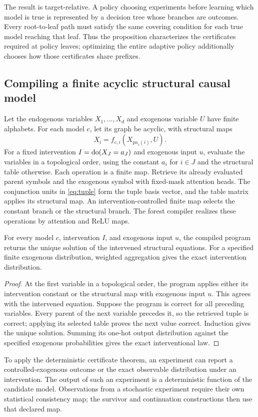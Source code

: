 The result is target-relative. A policy choosing experiments before learning which model is true is represented by a decision tree whose branches are outcomes. Every root-to-leaf path must satisfy the same covering condition for each true model reaching that leaf. Thus the proposition characterizes the certificates required at policy leaves; optimizing the entire adaptive policy additionally chooses how those certificates share prefixes.

\subsection{Compiling a finite acyclic structural causal model}
Let the endogenous variables $X_1,\ldots,X_d$ and exogenous variable $U$ have finite alphabets. For each model $c$, let its graph be acyclic, with structural maps
\[
 X_i=f_{c,i}(X_{\mathrm{pa}_c(i)},U).
\]
For a fixed intervention $I=\operatorname{do}(X_J=a_J)$ and exogenous input $u$, evaluate the variables in a topological order, using the constant $a_i$ for $i\in J$ and the structural table otherwise. Each operation is a finite map. Retrieve its already evaluated parent symbols and the exogenous symbol with fixed-mask attention heads. The conjunction units in \eqref{eq:tuple} form the tuple basis vector, and the table matrix applies its structural map. An intervention-controlled finite map selects the constant branch or the structural branch. The forest compiler realizes these operations by attention and ReLU maps.

\begin{proposition}\label{prop:scm}
For every model $c$, intervention $I$, and exogenous input $u$, the compiled program returns the unique solution of the intervened structural equations. For a specified finite exogenous distribution, weighted aggregation gives the exact intervention distribution.
\end{proposition}
\begin{proof}
At the first variable in a topological order, the program applies either its intervention constant or the structural map with exogenous input $u$. This agrees with the intervened equation. Suppose the program is correct for all preceding variables. Every parent of the next variable precedes it, so the retrieved tuple is correct; applying its selected table proves the next value correct. Induction gives the unique solution. Summing its one-hot output distribution against the specified exogenous probabilities gives the exact interventional law.
\end{proof}
To apply the deterministic certificate theorem, an experiment can report a controlled-exogenous outcome or the exact observable distribution under an intervention. The output of such an experiment is a deterministic function of the candidate model. Observations from a stochastic experiment require their own statistical consistency map; the survivor and continuation constructions then use that declared map.

